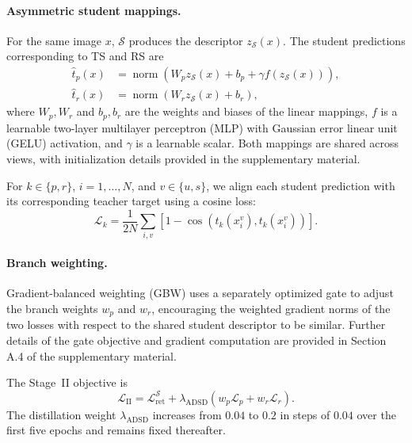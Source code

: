 \paragraph{Asymmetric student mappings.}
For the same image $x$, $\mathcal{S}$ produces the
descriptor $z_{\mathcal{S}}(x)$. The student predictions
corresponding to TS and RS are
\begin{equation}
\begin{aligned}
\hat{t}_p(x)&=\operatorname{norm}\!\left(
W_pz_{\mathcal{S}}(x)+b_p
+\gamma f(z_{\mathcal{S}}(x))\right),\\
\hat{t}_r(x)&=\operatorname{norm}\!\left(
W_rz_{\mathcal{S}}(x)+b_r\right),
\end{aligned}
\label{eq:adsd_student_heads}
\end{equation}
where $W_p,W_r$ and $b_p,b_r$ are the weights and biases
of the linear mappings, $f$ is a learnable two-layer
multilayer perceptron (MLP) with Gaussian error linear
unit (GELU) activation, and $\gamma$ is a learnable scalar.
Both mappings are shared across views, with initialization
details provided in the supplementary material.

For $k\in\{p,r\}$, $i=1,\ldots,N$, and $v\in\{u,s\}$,
we align each student prediction with its corresponding
teacher target using a cosine loss:
\begin{equation}
\mathcal{L}_k
=\frac{1}{2N}\sum_{i,v}
\left[
1-\cos\left(\hat{t}_k(x_i^v),t_k(x_i^v)\right)
\right].
\label{eq:adsd_branch_loss}
\end{equation}

\paragraph{Branch weighting.}
Gradient-balanced weighting (GBW) uses a separately
optimized gate to adjust the branch weights $w_p$ and
$w_r$, encouraging the weighted gradient norms of the
two losses with respect to the shared student descriptor
to be similar. Further details of the gate objective and
gradient computation are provided in Section A.4 of the supplementary
material.

The Stage~II objective is
\begin{equation}
\mathcal{L}_{\mathrm{II}}
=\mathcal{L}_{\mathrm{ret}}^{\mathcal{S}}
+\lambda_{\mathrm{ADSD}}\!\left(
w_p\mathcal{L}_p+w_r\mathcal{L}_r
\right).
\label{eq:stage_two_objective}
\end{equation}
The distillation weight $\lambda_{\mathrm{ADSD}}$ increases
from $0.04$ to $0.2$ in steps of $0.04$ over the first five
epochs and remains fixed thereafter.


